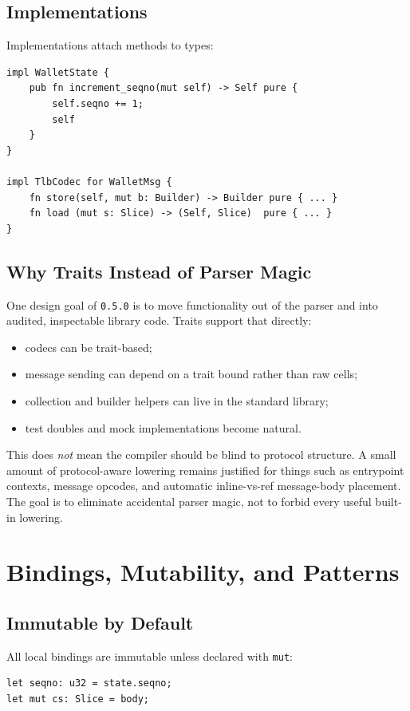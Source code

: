 \documentclass[12pt,oneside]{article}
\begin{document}
\subsection{Implementations}
Implementations attach methods to types:

\begin{verbatim}
impl WalletState {
    pub fn increment_seqno(mut self) -> Self pure {
        self.seqno += 1;
        self
    }
}

impl TlbCodec for WalletMsg {
    fn store(self, mut b: Builder) -> Builder pure { ... }
    fn load (mut s: Slice) -> (Self, Slice)  pure { ... }
}
\end{verbatim}

\subsection{Why Traits Instead of Parser Magic}
One design goal of \verb|0.5.0| is to move functionality out of the parser and
into audited, inspectable library code. Traits support that directly:

\begin{itemize}
\item codecs can be trait-based;
\item message sending can depend on a trait bound rather than raw cells;
\item collection and builder helpers can live in the standard library;
\item test doubles and mock implementations become natural.
\end{itemize}

This does \emph{not} mean the compiler should be blind to protocol structure.
A small amount of protocol-aware lowering remains justified for things such as
entrypoint contexts, message opcodes, and automatic inline-vs-ref message-body
placement. The goal is to eliminate accidental parser magic, not to forbid every
useful built-in lowering.

\section{Bindings, Mutability, and Patterns}
\subsection{Immutable by Default}
All local bindings are immutable unless declared with \verb|mut|:

\begin{verbatim}
let seqno: u32 = state.seqno;
let mut cs: Slice = body;
\end{verbatim}
\end{document}
